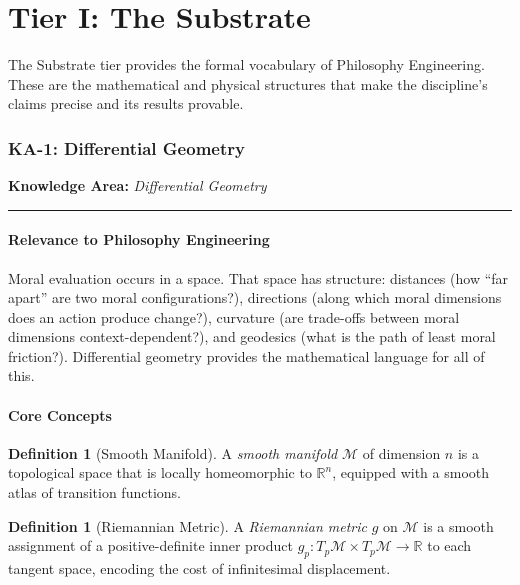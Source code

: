 \documentclass[12pt,letterpaper]{article}
\theoremstyle{definition}
\newtheorem{definition}[theorem]{Definition}
\theoremstyle{plain}
\newcommand{\R}{\mathbb{R}}
\newcommand{\calM}{\mathcal{M}}
\newcommand{\ka}[1]{\vspace{1em}\noindent\textbf{\large Knowledge Area:} \textit{#1}\vspace{0.5em}\hrule\vspace{0.5em}}
\begin{document}
\part{Tier I: The Substrate}
\label{part:substrate}

The Substrate tier provides the formal vocabulary of Philosophy Engineering. These are the mathematical and physical structures that make the discipline's claims precise and its results provable.

\section{KA-1: Differential Geometry}
\label{sec:ka1}

\ka{Differential Geometry}

\subsection{Relevance to Philosophy Engineering}

Moral evaluation occurs in a space. That space has structure: distances (how ``far apart'' are two moral configurations?), directions (along which moral dimensions does an action produce change?), curvature (are trade-offs between moral dimensions context-dependent?), and geodesics (what is the path of least moral friction?). Differential geometry provides the mathematical language for all of this.

\subsection{Core Concepts}

\begin{definition}[Smooth Manifold]
A \emph{smooth manifold} $\calM$ of dimension $n$ is a topological space that is locally homeomorphic to $\R^n$, equipped with a smooth atlas of transition functions.
\end{definition}

\begin{definition}[Riemannian Metric]
A \emph{Riemannian metric} $g$ on $\calM$ is a smooth assignment of a positive-definite inner product $g_p: T_p\calM \times T_p\calM \to \R$ to each tangent space, encoding the cost of infinitesimal displacement.
\end{definition}
\end{document}

